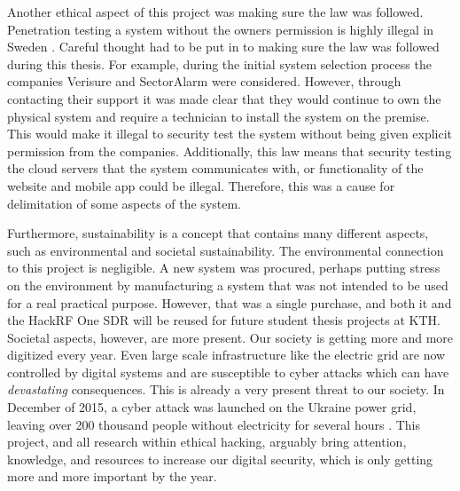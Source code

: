 Another ethical aspect of this project was making sure the law was followed. Penetration testing a system without the owners permission is highly illegal in Sweden \cite{brottsbalken-it-brott}. Careful thought had to be put in to making sure the law was followed during this thesis. For example, during the initial system selection process the companies Verisure and SectorAlarm were considered. However, through contacting their support it was made clear that they would continue to own the physical system and require a technician to install the system on the premise. This would make it illegal to security test the system without being given explicit permission from the companies. Additionally, this law means that security testing the cloud servers that the system communicates with, or functionality of the website and mobile app could be illegal. Therefore, this was a cause for delimitation of some aspects of the system.

Furthermore, sustainability is a concept that contains many different aspects, such as environmental and societal sustainability. The environmental connection to this project is negligible. A new system was procured, perhaps putting stress on the environment by manufacturing a system that was not intended to be used for a real practical purpose. However, that was a single purchase, and both it and the HackRF One SDR will be reused for future student thesis projects at KTH. Societal aspects, however, are more present. Our society is getting more and more digitized every year. Even large scale infrastructure like the electric grid are now controlled by digital systems and are susceptible to cyber attacks which can have \textit{devastating} consequences. This is already a very present threat to our society. In December of 2015, a cyber attack was launched on the Ukraine power grid, leaving over 200 thousand people without electricity for several hours \cite{urkaine-power-grid-analysis}. This project, and all research within ethical hacking, arguably bring attention, knowledge, and resources to increase our digital security, which is only getting more and more important by the year.
